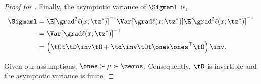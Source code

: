 \begin{proof}[Proof for ]
Finally, the asymptotic variance of $\Sigmaml$ is,
\begin{align*}
    \Sigmaml &= \E[\grad^2 \ell(x ; \tz^*)]^{-1} \Var[\grad \ell(x ; \tz^*)] \E[\grad^2 \ell(x ; \tz^*)]^{-1} \\
      &= \Var[\grad \ell(x;\tz^*)]^{-1} \\
      &= \left( \tOt \tD\inv \tO + \td\inv \tOt \ones \ones^\top \tO \right)\inv.
\end{align*}

Given our assumptions, $\ones \succ \mu \succ \zeros$. Consequently,
$\tD$ is invertible and the asymptotic variance is finite.
\end{proof}

